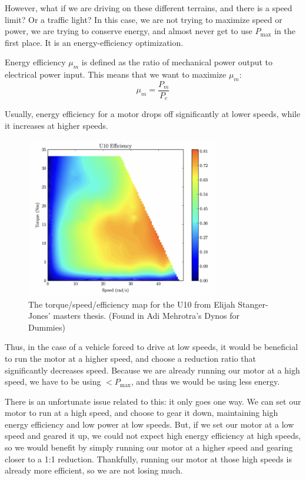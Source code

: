 \documentclass[12pt]{article}
\begin{document}
However, what if we are driving on these different terrains, and there is a speed limit? Or a traffic light? In this case, we are not trying to maximize speed or power, we are trying to conserve energy, and almost never get to use $P_{\max}$ in the first place. It is an energy-efficiency optimization.

Energy efficiency $\mu_{m}$ is defined as the ratio of mechanical power output to electrical power input. This means that we want to maximize $\mu_{m}$:
\begin{equation}
  \mu_{m} = \frac{P_{m}}{P_{e}}
\end{equation}

Usually, energy efficiency for a motor drops off significantly at lower speeds, while it increases at higher speeds. 

\begin{figure}[H]
  \centering
  \includegraphics[width=0.75\textwidth]{motor-efficiency.png}
  \caption{The torque/speed/efficiency map for the U10 from Elijah Stanger-Jones’ masters thesis. (Found in Adi Mehrotra's Dynos for Dummies)}\label{fig:motor_efficiency}
\end{figure}

Thus, in the case of a vehicle forced to drive at low speeds, it would be beneficial to run the motor at a higher speed, and choose a reduction ratio that significantly decreases speed. Because we are already running our motor at a high speed, we have to be using $< P_{\max}$, and thus we would be using less energy.

There is an unfortunate issue related to this: it only goes one way. We can set our motor to run at a high speed, and choose to gear it down, maintaining high energy efficiency and low power at low speeds. But, if we set our motor at a low speed and geared it up, we could not expect high energy efficiency at high speeds, so we would benefit by simply running our motor at a higher speed and gearing closer to a 1:1 reduction. Thankfully, running our motor at those high speeds is already more efficient, so we are not losing much.
\end{document}
